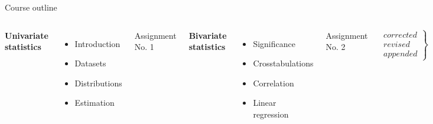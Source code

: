 \documentclass[t]{beamer}
\begin{document}
	\begin{frame}[t]{Course outline}
	
	\begin{columns}[T]
	\textbf{Univariate\\statistics}
	
	\vspace{.55em}
	\begin{itemize}
		\item Introduction
		\item Datasets
		\item Distributions
		\item Estimation
	\end{itemize}
	Assignment No. 1
	
	\textbf{Bivariate\\statistics}
	
	\begin{itemize}
		\item Significance
		\item Crosstabulations
		\item Correlation
		\item Linear regression
	\end{itemize}
	Assignment No. 2
	
	$$
	\left.
    \begin{array}{rrr}
        corrected \\
        revised\\
        appended
    \end{array}
	\right \} 
	$$

	\textbf{Statistical\\modelling}
	
	\begin{itemize}
		\item Basics
		\item Extensions
		\item Diagnostics
		\item Conclusion
	\end{itemize}
	\\[.5em]
	\end{columns}
	
	\end{frame}
	
\end{document}

